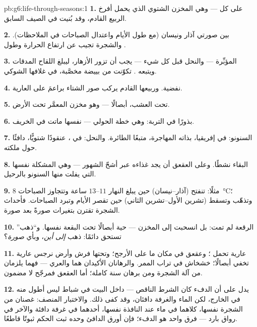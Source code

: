 \begin{solution}{pb:g6:life-through-seasons:1}
\textbf{1.}  على كل  --- وهي المخزن الشتوي الذي يحمل
أفرخ الربيع القادم، وقد بُنيت في الصيف السابق.

\textbf{2.} بين صورتي آذار ونيسان (مع طول الأيام واعتدال الصباحات
في الملاحظات). والشجرة تجيب عن ارتفاع الحرارة وطول .

\textbf{3.}  المؤبِّرة --- والنحل قبل كل شيء --- يجب أن
تزور الأزهار، ليبلغ اللقاح المدقات ويتبعه .  
تكوّنت من بييضة مخصَّبة، في غلافها الشوكي.

\textbf{4.} نفضية. وربيعها القادم يركب صور الشتاء براعمَ على
 العارية.

\textbf{5.} تحت العشب، أبصالًا --- وهو مخزن المعمَّر تحت الأرض.

\textbf{6.} بذورًا في التربة: وهي خطة الحولي ---  نفسها
ماتت في الخريف.

\textbf{7.} السنونو: في إفريقيا، بذاته المهاجرة، متبعًا 
الطائرة. والنحل: في ، عنقودًا شتويًّا، دافئًا حول ملكته.

\textbf{8.} البقاء نشطًا. وعلى العقعق أن يجد غذاءه عبر أشحّ
الشهور --- وهي المشكلة نفسها التي يفلت منها السنونو بالرحيل.

\textbf{9.} مثلًا: تنفتح  (آذار--نيسان) حين يبلغ النهار
$11$--$13$ ساعة وتتجاوز الصباحات
\qty{8}{\degreeCelsius}؛ وتذهّب  وتسقط (تشرين
الأول--تشرين الثاني) حين تقصر الأيام وتبرد الصباحات. فأحداث
الشجرة تقترن بتغيرات  صورةً بعد صورة.

\textbf{10.} الرقعة لم تمت: بل انسحبت إلى المخزن --- حية أبصالًا
تحت البقعة نفسها. و``ذهب'' تستحق دائمًا: ذهب \emph{إلى أين}،
وبأي \emph{صورة}؟

\textbf{11.}  عارية تحمل ؛ وعقعق في مكان ما على
الأرجح؛ وتحتها فرش  وأرض نرجس عارية تخفي أبصالًا؛  خشخاش
في تراب الممر. والرهانان الأكيدان هما  والعري --- فهما
يلزمان من آلة الشجرة  ومن برهان سنة كاملة؛ أما العقعق
فمرجّح لا مضمون.

\textbf{12.} يدل على أن الدفء كان الشرط الناقص ---  داخل
البيت في شباط ليس أطول منه في الخارج، لكن الماء والغرفة دافئان،
وقد كفى ذلك. والاختبار المنصف: غصنان من الشجرة نفسها، كلاهما في
ماء عند النافذة نفسها، أحدهما في غرفة دافئة والآخر في رواق بارد
--- فرق واحد هو الدفء؛ فإن أورق الدافئ وحده ثبت الحكم ثبوتًا
قاطعًا.
\end{solution}
